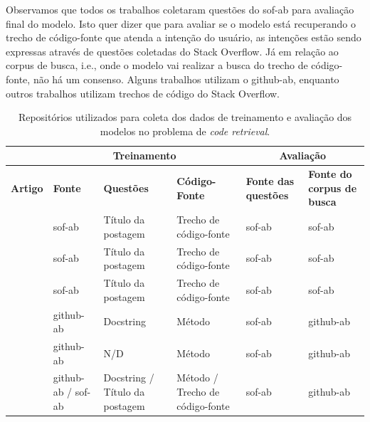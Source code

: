 Observamos que todos os trabalhos coletaram questões do \acrfull{sof-ab} para avaliação final do modelo. Isto quer dizer que para avaliar se o modelo está recuperando o trecho de código-fonte que atenda a intenção do usuário, as intenções estão sendo expressas através de questões coletadas do Stack Overflow. Já em relação ao corpus de busca, i.e., onde o modelo vai realizar a busca do trecho de código-fonte, não há um consenso. Alguns trabalhos \citep{Gu-deep-code-search:2018, Sachdev-neural-code-search:2018, cambronero-deep-learning-code-search:2019} utilizam o \acrfull{github-ab}, enquanto outros trabalhos \citep{Allamanis-bimodal-source-code-natural-language:2015, iyer-etal-2016-summarizing, Chen-bi-variational-autoencoder:2018} utilizam trechos de código do Stack Overflow.

\begin{table}[h]
\centering
\begin{tabular}{ p{8em} p{5em} p{5em} p{5em} p{5em} p{5em} }
\hline
 & \multicolumn{3}{c}{\textbf{Treinamento}} & \multicolumn{2}{c}{\textbf{Avaliação}} \\
\hline
\textbf{Artigo} & \textbf{Fonte} & \textbf{Questões} & \textbf{Código-Fonte} & \textbf{Fonte das questões} & \textbf{Fonte do corpus de busca}\\
\hline

\cite{Allamanis-bimodal-source-code-natural-language:2015} & \acrshort{sof-ab} & Título da postagem & Trecho de código-fonte & \acrshort{sof-ab} & \acrshort{sof-ab}\\

\cite{Chen-bi-variational-autoencoder:2018} & \acrshort{sof-ab} & Título da postagem & Trecho de código-fonte & \acrshort{sof-ab} & \acrshort{sof-ab}\\

\cite{iyer-etal-2016-summarizing} & \acrshort{sof-ab} & Título da postagem & Trecho de código-fonte & \acrshort{sof-ab} & \acrshort{sof-ab}\\

\cite{Gu-deep-code-search:2018} & \acrshort{github-ab} & Docstring & Método & \acrshort{sof-ab} & \acrshort{github-ab}\\

\cite{Sachdev-neural-code-search:2018} & \acrshort{github-ab} & N/D & Método	& \acrshort{sof-ab} & \acrshort{github-ab}\\

\cite{cambronero-deep-learning-code-search:2019} & \acrshort{github-ab} / \acrshort{sof-ab} & Docstring / Título da postagem & Método / Trecho de código-fonte & \acrshort{sof-ab} & \acrshort{github-ab}\\

 \hline
 
\end{tabular}
\caption{Repositórios utilizados para coleta dos dados de treinamento e avaliação dos modelos no problema de \textit{code retrieval}.}
\label{table:summary-source-data}
\end{table}


